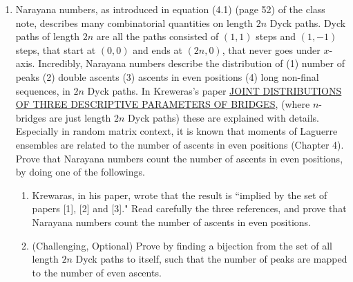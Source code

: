 \documentclass{article}
\begin{document}
\begin{enumerate}
    \item Narayana numbers, as introduced in equation (4.1) (page 52) of the class note, describes many combinatorial quantities on length $2n$ Dyck paths. Dyck paths of length $2n$ are all the paths consisted of $(1, 1)$ steps and $(1, -1)$ steps, that start at $(0, 0)$ and ends at $(2n, 0)$, that never goes under $x$-axis. Incredibly, Narayana numbers describe the distribution of (1) number of peaks (2) double ascents (3) ascents in even positions (4) long non-final sequences, in $2n$ Dyck paths. In Kreweras's paper \href{https://link.springer.com/content/pdf/10.1007/BFb0072516.pdf}{\color{blue} JOINT DISTRIBUTIONS OF THREE DESCRIPTIVE PARAMETERS OF BRIDGES}, (where $n$-bridges are just length $2n$ Dyck paths) these are explained with details. Especially in random matrix context, it is known that moments of Laguerre ensembles are related to the number of ascents in even positions (Chapter 4). Prove that Narayana numbers count the number of ascents in even positions, by doing one of the followings.
    \begin{enumerate}
        \item Krewaras, in his paper, wrote that the result is ``implied by the set of papers [1], [2] and [3]." Read carefully the three references, and prove that Narayana numbers count the number of ascents in even positions. 
        \item (Challenging, Optional) Prove by finding a bijection from the set of all length $2n$ Dyck paths to itself, such that the number of peaks are mapped to the number of even ascents. 
    \end{enumerate}
\end{enumerate}


 
\end{document}
